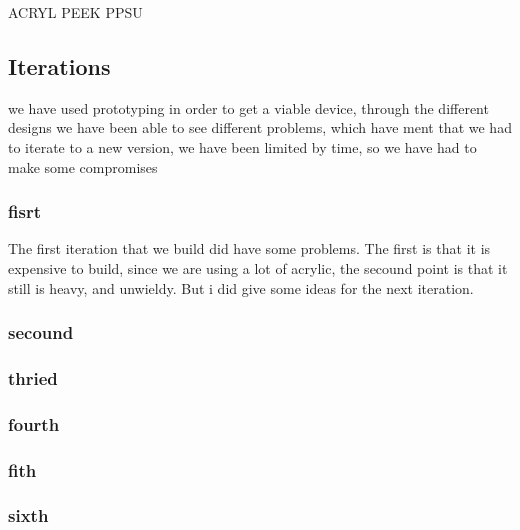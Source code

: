 ACRYL
PEEK
PPSU

\subsection{Iterations}
we have used prototyping in order to get a viable device, through the different designs we have been able to see different problems, which have ment that we had to iterate to a new version, we have been limited by time, so we have had to make some compromises

\subsubsection{fisrt}
The first iteration that we build did have some problems.
The first is that it is expensive to build, since we are using a lot of acrylic, the secound point is that it still is heavy, and unwieldy.
But i did give some ideas for the next iteration.

\subsubsection{secound}


\subsubsection{thried}


\subsubsection{fourth}


\subsubsection{fith}

\subsubsection{sixth}

